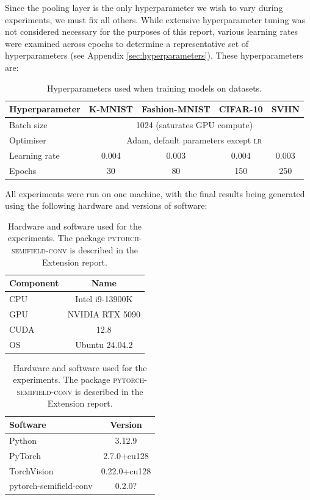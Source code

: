 \documentclass[a4paper, 12pt]{report}
\def\comment#1{\color{red}#1\color{black}}
\begin{document}
Since the pooling layer is the only hyperparameter we wish to vary during experiments, we must fix all others. While extensive hyperparameter tuning was not considered necessary for the purposes of this report, various learning rates were examined across epochs to determine a representative set of hyperparameters (see Appendix \ref{sec:hyperparameters}). These hyperparameters are:

\begin{table}[!htbp]
\centering
\begin{tabular}{l|*4c}
\toprule
Hyperparameter & K-MNIST & Fashion-MNIST & CIFAR-10 & SVHN\\
\midrule
Batch size & \multicolumn{4}{c}{1024 (saturates GPU compute)}\\
Optimiser   &  \multicolumn{4}{c}{Adam, default parameters except \textsc{lr}} \\
Learning rate & 0.004 & 0.003 & 0.004 & 0.003 \\
Epochs & 30 & 80 & 150 & 250 \\
\bottomrule
\end{tabular}
\caption{Hyperparameters used when training models on datasets.}
\end{table}
\noindent
All experiments were run on one machine, with the final results being generated using the following hardware and versions of software:

\begin{table}[!htbp]
\centering
\begin{tabular}{l|c}
\toprule
Component & Name \\
\midrule
CPU & Intel i9-13900K \\
GPU & NVIDIA RTX 5090 \\
CUDA & 12.8\\
OS & Ubuntu 24.04.2\\
\bottomrule
\end{tabular}
\quad
\begin{tabular}{l|c}
\toprule
Software & Version \\
\midrule
Python & 3.12.9 \\
PyTorch & 2.7.0+cu128 \\
TorchVision & 0.22.0+cu128 \\
\small pytorch-semifield-conv & \comment{0.2.0?} \\
\bottomrule
\end{tabular}

\caption{Hardware and software used for the experiments. The package \textsc{pytorch-semifield-conv} is described in the Extension report.}
\vspace{-0.3cm}
\end{table}
\end{document}
